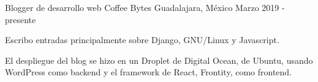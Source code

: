 \begin{cventries}
  \cventry
    {Blogger de desarrollo web}
    {Coffee Bytes}
    {Guadalajara, México}
    {Marzo 2019 - presente}
    {
      \begin{cvitems}
        \item {Escribo entradas principalmente sobre Django, GNU/Linux y Javascript.}
        \item {El despliegue del blog se hizo en un Droplet de Digital Ocean, de Ubuntu, usando WordPress como backend y el framework de React, Frontity, como frontend.}
      \end{cvitems}
    }

\end{cventries}

